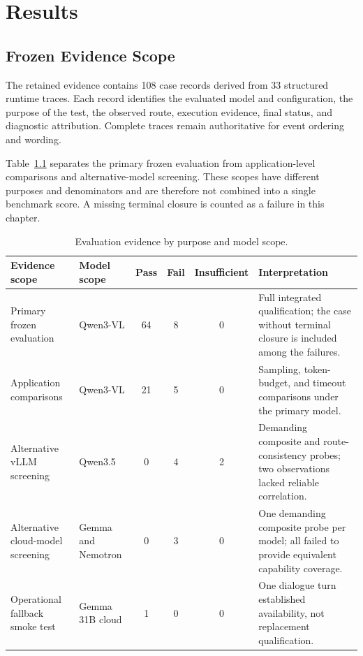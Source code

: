 \chapter{Results}
\label{chap:results}

\section{Frozen Evidence Scope}

The retained evidence contains 108 case records derived from 33 structured runtime traces. Each record identifies the evaluated model and configuration, the purpose of the test, the observed route, execution evidence, final status, and diagnostic attribution. Complete traces remain authoritative for event ordering and wording.

Table~\ref{tab:final-evidence-scope} separates the primary frozen evaluation from application-level comparisons and alternative-model screening. These scopes have different purposes and denominators and are therefore not combined into a single benchmark score. A missing terminal closure is counted as a failure in this chapter.

\begin{table}[H]
\centering
\footnotesize
\renewcommand{\arraystretch}{1.14}
\caption{Evaluation evidence by purpose and model scope.}
\label{tab:final-evidence-scope}
\begin{tabularx}{\textwidth}{@{}>{\RaggedRight\arraybackslash}p{}>{\RaggedRight\arraybackslash}p{}ccc>{\RaggedRight\arraybackslash}X@{}}
\toprule
\textbf{Evidence scope} & \textbf{Model scope} & \textbf{Pass} & \textbf{Fail} & \textbf{Insufficient} & \textbf{Interpretation}\\
\midrule
Primary frozen evaluation & Qwen3-VL & 64 & 8 & 0 & Full integrated qualification; the case without terminal closure is included among the failures.\\
Application comparisons & Qwen3-VL & 21 & 5 & 0 & Sampling, token-budget, and timeout comparisons under the primary model.\\
Alternative vLLM screening & Qwen3.5 & 0 & 4 & 2 & Demanding composite and route-consistency probes; two observations lacked reliable correlation.\\
Alternative cloud-model screening & Gemma and Nemotron & 0 & 3 & 0 & One demanding composite probe per model; all failed to provide equivalent capability coverage.\\
Operational fallback smoke test & Gemma 31B cloud & 1 & 0 & 0 & One dialogue turn established availability, not replacement qualification.\\
\bottomrule
\end{tabularx}
\end{table}

